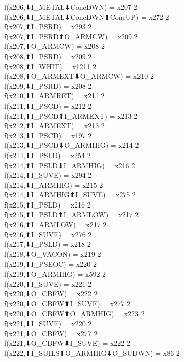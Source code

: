 f(x206,⬇I_METAL⬇ConcDWN) = x207 {2} \\
f(x206,⬇I_METAL⬇ConcDWN⬆ConcUP) = x272 {2} \\
f(x207,⬆I_PSRD) = x293 {2} \\
f(x207,⬆I_PSRD⬆O_ARMCW) = x209 {2} \\
f(x207,⬆O_ARMCW) = x208 {2} \\
f(x208,⬆I_PSRD) = x209 {2} \\
f(x208,⬆I_WHIT) = x1211 {2} \\
f(x208,⬆O_ARMEXT⬇O_ARMCW) = x210 {2} \\
f(x209,⬇I_PSRD) = x208 {2} \\
f(x210,⬇I_ARMRET) = x211 {2} \\
f(x211,⬆I_PSCD) = x212 {2} \\
f(x211,⬆I_PSCD⬆I_ARMEXT) = x213 {2} \\
f(x212,⬆I_ARMEXT) = x213 {2} \\
f(x213,⬇I_PSCD) = x197 {2} \\
f(x213,⬇I_PSCD⬇O_ARMHIG) = x214 {2} \\
f(x214,⬆I_PSLD) = x254 {2} \\
f(x214,⬆I_PSLD⬇I_ARMHIG) = x216 {2} \\
f(x214,⬆I_SUVE) = x294 {2} \\
f(x214,⬇I_ARMHIG) = x215 {2} \\
f(x214,⬇I_ARMHIG⬆I_SUVE) = x275 {2} \\
f(x215,⬆I_PSLD) = x216 {2} \\
f(x215,⬆I_PSLD⬆I_ARMLOW) = x217 {2} \\
f(x216,⬆I_ARMLOW) = x217 {2} \\
f(x216,⬆I_SUVE) = x276 {2} \\
f(x217,⬇I_PSLD) = x218 {2} \\
f(x218,⬇O_VACON) = x219 {2} \\
f(x219,⬆I_PSEOC) = x220 {2} \\
f(x219,⬆O_ARMHIG) = x592 {2} \\
f(x220,⬆I_SUVE) = x221 {2} \\
f(x220,⬇O_CBFW) = x222 {2} \\
f(x220,⬇O_CBFW⬆I_SUVE) = x277 {2} \\
f(x220,⬇O_CBFW⬆O_ARMHIG) = x223 {2} \\
f(x221,⬇I_SUVE) = x220 {2} \\
f(x221,⬇O_CBFW) = x277 {2} \\
f(x221,⬇O_CBFW⬇I_SUVE) = x222 {2} \\
f(x222,⬆I_SUILS⬆O_ARMHIG⬇O_SUDWN) = x86 {2} \\
